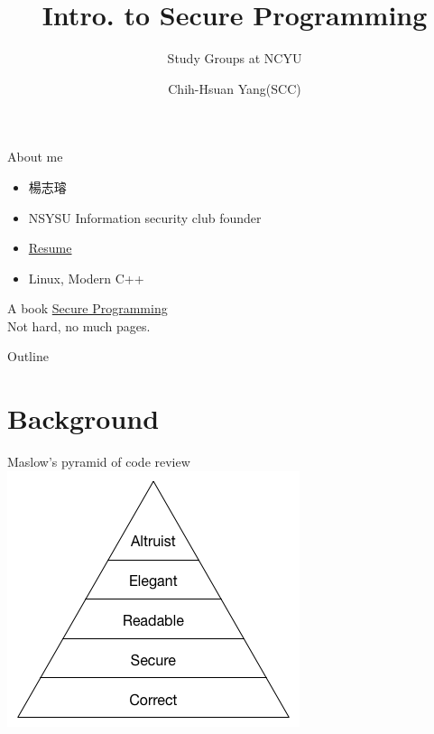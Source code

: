 \documentclass{beamer}
\begin{document}
\begin{CJK*}{UTF8}{bsmi}

    \title{Intro. to Secure Programming}
    \subtitle{Study Groups at NCYU}
    \author{Chih-Hsuan Yang(SCC)}

    \begin{frame}
        \titlepage
    \end{frame}

    \begin{frame}{About me}
        \begin{itemize}
            \item 楊志璿
            \item NSYSU Information security club founder
            \item \href{https://github.com/25077667/Resume/blob/main/resume/resume.pdf}{Resume}
            \item Linux, Modern C++
        \end{itemize}
    \end{frame}

    \begin{frame}{A book}
        \href{https://dwheeler.com/secure-programs/}{Secure Programming}\\
        Not hard, no much pages.
    \end{frame}

    \begin{frame}{Outline}
        \begin{multicols}{2}
            \tableofcontents
        \end{multicols}
    \end{frame}

    \section{Background}
    \begin{frame}{Maslow’s pyramid of code review}
        \centering\includegraphics[height=.9\textheight]{Maslow.png}
    \end{frame}


\end{CJK*}
\end{document}
